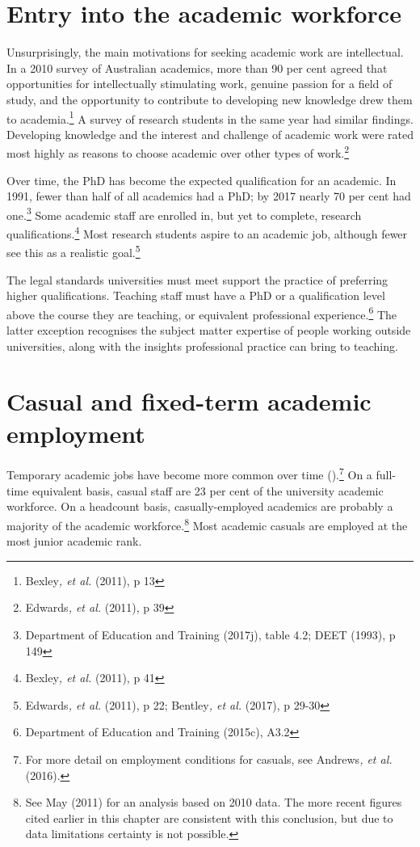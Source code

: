 \documentclass{grattan}
\begin{document}
%
\section{Entry into the academic workforce}\label{sec:entry-into-the-academic-workforce}

Unsurprisingly, the main motivations for seeking academic work are intellectual. In a 2010 survey of Australian academics, more than 90 per cent agreed that opportunities for intellectually stimulating work, genuine passion for a field of study, and the opportunity to contribute to developing new knowledge drew them to academia.\footnote{Bexley\emph{, et al.} (2011), p 13} A survey of research students in the same year had similar findings. Developing knowledge and the interest and challenge of academic work were rated most highly as reasons to choose academic over other types of work.\footnote{Edwards\emph{, et al.} (2011), p 39}

Over time, the PhD has become the expected qualification for an academic. In 1991, fewer than half of all academics had a PhD; by 2017 nearly 70 per cent had one.\footnote{Department of Education and Training (2017j), table 4.2; DEET (1993), p 149} Some academic staff are enrolled in, but yet to complete, research qualifications.\footnote{Bexley\emph{, et al.} (2011), p 41} Most research students aspire to an academic job, although fewer see this as a realistic goal.\footnote{Edwards\emph{, et al.} (2011), p 22; Bentley\emph{, et al.} (2017), p 29-30}

The legal standards universities must meet support the practice of preferring higher qualifications. Teaching staff must have a PhD or a qualification level above the course they are teaching, or equivalent professional experience.\footnote{Department of Education and Training (2015c), A3.2} The latter exception recognises the subject matter expertise of people working outside universities, along with the insights professional practice can bring to teaching.

%
\section{Casual and fixed-term academic employment }\label{sec:casual-and-fixed-term-academic-employment}

Temporary academic jobs have become more common over time ().\footnote{For more detail on employment conditions for casuals, see Andrews\emph{, et al.} (2016).} On a full-time equivalent basis, casual staff are 23 per cent of the university academic workforce. On a headcount basis, casually-employed academics are probably a majority of the academic workforce.\footnote{See May (2011) for an analysis based on 2010 data. The more recent figures cited earlier in this chapter are consistent with this conclusion, but due to data limitations certainty is not possible.} Most academic casuals are employed at the most junior academic rank.
\end{document}
